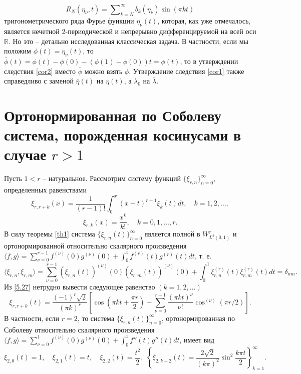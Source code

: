 \begin{equation}\label{5.26}
R_N(\eta_\nu,t)= \sum\nolimits_{k=N}^\infty b_k(\eta_\nu)\sin(\pi kt)
\end{equation}
тригонометрического ряда Фурье  функции $\eta_\nu(t)$, которая, как уже отмечалось, является нечетной 2-периодической и непрерывно дифференцируемой на всей оси $\mathbb{R}$. Но это -- детально исследованная классическая задача. В частности, если мы положим $\phi(t)=\eta_\nu(t)$, то $\bar \phi(t)=\phi(t)-\phi(0)-(\phi(1)-\phi(0))t=\phi(t)$, то в утверждении следствия  \ref{cor2} вместо  $\bar \phi$ можно взять $\phi$. Утверждение следствия \ref{cor1} также справедливо с заменой  $\bar\eta(t)$  на $\eta(t)$, а   $\lambda_0$ на $\bar\lambda$.

\section{Ортонормированная по Соболеву  система, порожденная косинусами в случае $r>1$}

Пусть $1<r$ -- натуральное. Рассмотрим систему функций $\{\xi_{r,n}\}_{n=0}^\infty$, определенных равенствами
\begin{equation}\label{5.27}
\xi_{r,r+k}(x) =\frac{1}{(r-1)!}\int_0^x(x-t)^{r-1}\xi_{k}(t)dt, \quad k=1,2,\ldots,
\end{equation}
\begin{equation}\label{5.28}
\xi_{r,k}(x) =\frac{x^k}{k!}, \quad k=0,1,\ldots, r.
\end{equation}
В силу теоремы \ref{th1} система $\{\xi_{r,n}(t)\}_{n=0}^\infty$ является полной в $W^r_{L^2(0,1)}$ и ортонормированной относительно скалярного произведения $\langle f,g\rangle=\sum_{\nu=0}^{r-1}f^{(\nu)}(0)g^{(\nu)}(0)+\int_0^1 f^{(r)}(t)g^{(r)}(t)dt$, т. е.
\begin{equation*}
\langle\xi_{r,n},\xi_{r,m}\rangle=
\sum_{\nu=0}^{r-1}(\xi_{r,n}(t))^{(\nu)}(0)(\xi_{r,m}(t))^{(\nu)}(0)
+\int_0^1\xi^{(r)}_{r,n}(t)\xi^{(r)}_{r,m}(t)dt=\delta_{nm}.
\end{equation*}
Из \eqref{5.27} нетрудно вывести следующее равенство $(k=1,2,\ldots)$
\begin{equation}\label{5.29}
\xi_{r,r+k}(t) =\frac{(-1)^r\sqrt{2}}{(\pi k)^r}\left[
\cos\left(\pi kt+\frac{\pi r}{2}\right)-\sum_{\nu=0}^{r-1} \frac{(\pi kt)^\nu}{\nu!}\cos^{(\nu)}(\pi r/2)\right].
\end{equation}
В частности, если $r=2$, то система $\{\xi_{r,n}(t)\}_{n=0}^\infty$, ортонормированная по Соболеву относительно скалярного произведения $\langle f,g\rangle=\sum_{\nu=0}^1f^{(\nu)}(0)g^{(\nu)}(0)+\int_0^1 f''(t)g''(t)dt$,
имеет вид
\begin{equation}\label{5.30}
\xi_{2,0}(t) =1, \quad \xi_{2,1}(t)=t, \quad \xi_{2,2}(t)=\frac{t^2}2,\,\,\left\{ \xi_{2,k+2}(t)=  \frac{2\sqrt{2}}{(k\pi)^2}\sin^2\frac{k\pi t}{2}\right\}_{k=1}^\infty.
\end{equation}



